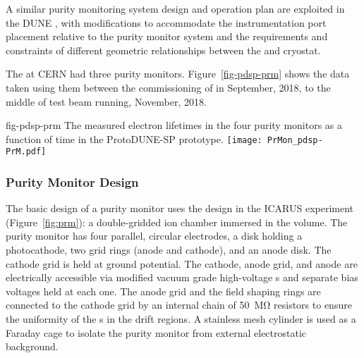   A similar purity monitoring system design and operation plan are exploited in the DUNE  , with modifications to accommodate the instrumentation port placement relative to the purity monitor system and the requirements and constraints of different geometric relationships between the  and cryostat.









The  at CERN had three purity monitors. Figure~\ref{fig-pdsp-prm} shows the data taken using them between the commissioning of  in September, 2018, to the middle of test beam running, November, 2018. 

\begin{dunefigure}{fig-pdsp-prm}
  {The measured electron lifetimes in the four purity monitors as a function of time in the ProtoDUNE-SP prototype.}
  \texttt{[image: PrMon\_pdsp-PrM.pdf]}
\end{dunefigure}




\subsubsection{Purity Monitor Design}

The basic design of a purity monitor uses the design in the ICARUS experiment (Figure~\ref{fig:prm})\cite{Adamowski:2014daa}: a double-gridded ion chamber immersed in the \lar volume.   The purity monitor has four parallel, circular electrodes, a disk holding a photocathode, two grid rings (anode and cathode), and an anode disk. The cathode grid is held at ground potential. The cathode, anode grid, and anode are electrically accessible via modified vacuum grade high-voltage \fdth{}s and separate bias voltages held at each one.  
The anode grid and the field shaping rings are connected to the cathode grid by an internal chain of \SI{50}{\mega\ohm} resistors to ensure the uniformity of the \efield{}s in the drift regions. A stainless mesh cylinder is used as a Faraday cage to isolate the purity monitor from external electrostatic background. 

